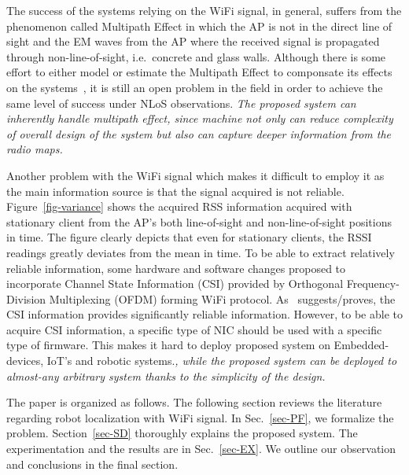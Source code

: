 \documentclass[letterpaper, 10 pt, conference]{ieeeconf}  %
\begin{document}
  The success of the systems relying on the WiFi signal, in general, suffers from the phenomenon called Multipath Effect in which the AP is not in the direct line of sight and the EM waves from the AP where the received signal is propagated through non-line-of-sight, i.e.~concrete and glass walls.
  Although there is some effort to either model or estimate the Multipath Effect to componsate its effects on the systems~\cite{cai2015identification}, it is still an open problem in the field in order to achieve the same level of success under NLoS observations.
  \textit{The proposed system can inherently handle multipath effect, since machine not only can reduce complexity of overall design of the system but also can capture deeper information from the radio maps.}

  Another problem with the WiFi signal which makes it difficult to employ it as the main information source is that the signal acquired is not reliable.
  Figure~\ref{fig-variance} shows the acquired RSS information acquired with stationary client from the AP's both line-of-sight and non-line-of-sight positions in time.
  The figure clearly depicts that even for stationary clients, the RSSI readings greatly deviates from the mean in time.
  To be able to extract relatively reliable information, some hardware and software changes proposed to incorporate Channel State Information (CSI) provided by Orthogonal Frequency-Division Multiplexing (OFDM) forming WiFi protocol.
  As~\cite{gao2015channel} suggests/proves, the CSI information provides significantly reliable information.
  However, to be able to acquire CSI information, a specific type of NIC should be used with a specific type of firmware.
  This makes it hard to deploy proposed system on Embedded-devices, IoT's and robotic systems.\textit{, while the proposed system can be deployed to almost-any arbitrary system thanks to the simplicity of the design.}


  The paper is organized as follows.
  The following section reviews the literature regarding robot localization with WiFi signal.
  In Sec.~\ref{sec-PF}, we formalize the problem.
  Section~\ref{sec-SD} thoroughly explains the proposed system.
  The experimentation and the results are  in Sec.~\ref{sec-EX}.
  We outline our observation and conclusions in the final section.
\end{document}
